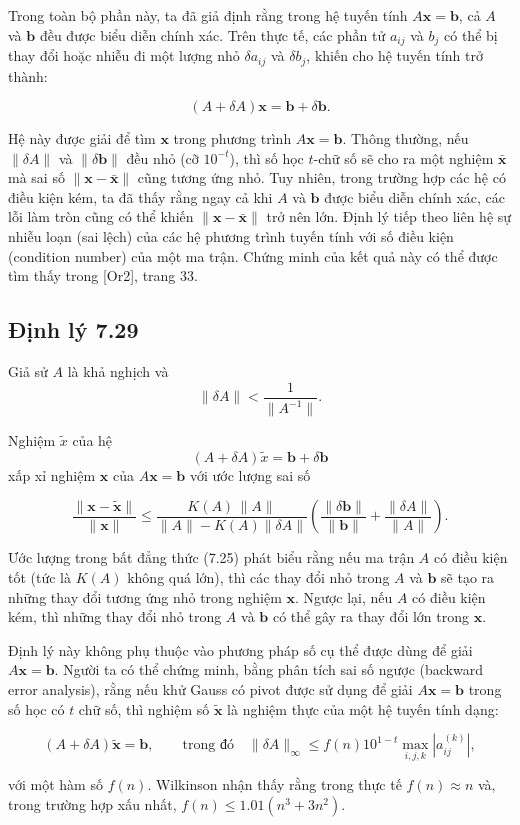 Trong toàn bộ phần này, ta đã giả định rằng trong hệ tuyến tính $A\mathbf{x} = \mathbf{b}$, cả $A$ và $\mathbf{b}$ đều được biểu diễn chính xác.  
Trên thực tế, các phần tử $a_{ij}$ và $b_j$ có thể bị thay đổi hoặc nhiễu đi một lượng nhỏ $\delta a_{ij}$ và $\delta b_j$, khiến cho hệ tuyến tính trở thành:

\[
(A + \delta A)\mathbf{x} = \mathbf{b} + \delta \mathbf{b}.
\]

Hệ này được giải để tìm $\mathbf{x}$ trong phương trình $A\mathbf{x} = \mathbf{b}$.  
Thông thường, nếu $\|\delta A\|$ và $\|\delta \mathbf{b}\|$ đều nhỏ (cỡ $10^{-t}$), thì số học $t$-chữ số sẽ cho ra một nghiệm $\bar{\mathbf{x}}$ mà sai số $\|\mathbf{x} - \bar{\mathbf{x}}\|$ cũng tương ứng nhỏ.  
Tuy nhiên, trong trường hợp các hệ có điều kiện kém, ta đã thấy rằng ngay cả khi $A$ và $\mathbf{b}$ được biểu diễn chính xác, các lỗi làm tròn cũng có thể khiến $\|\mathbf{x} - \bar{\mathbf{x}}\|$ trở nên lớn. Định lý tiếp theo liên hệ sự nhiễu loạn (sai lệch) của các hệ phương trình tuyến tính với số điều kiện (condition number) của một ma trận. Chứng minh của kết quả này có thể được tìm thấy trong [Or2], trang 33.


\subsection*{Định lý 7.29}

Giả sử \(A\) là khả nghịch và
\[
\|\delta A\| < \frac{1}{\|A^{-1}\|}.
\]

Nghiệm \(\tilde{x}\) của hệ
\[
(A + \delta A)\tilde{x} = \mathbf{b} + \delta\mathbf{b}
\]
xấp xỉ nghiệm \(\mathbf{x}\) của \(A\mathbf{x} = \mathbf{b}\) với ước lượng sai số

\[
\frac{\|\mathbf{x} - \tilde{\mathbf{x}}\|}{\|\mathbf{x}\|}
\le
\frac{K(A)\,\|A\|}{\|A\| - K(A)\|\delta A\|}
\left(
\frac{\|\delta\mathbf{b}\|}{\|\mathbf{b}\|}
+
\frac{\|\delta A\|}{\|A\|}
\right).
\tag{7.25}
\]

Ước lượng trong bất đẳng thức (7.25) phát biểu rằng nếu ma trận \(A\) có điều kiện tốt (tức là \(K(A)\) không quá lớn), thì các thay đổi nhỏ trong \(A\) và \(\mathbf{b}\) sẽ tạo ra những thay đổi tương ứng nhỏ trong nghiệm \(\mathbf{x}\). Ngược lại, nếu \(A\) có điều kiện kém, thì những thay đổi nhỏ trong \(A\) và \(\mathbf{b}\) có thể gây ra thay đổi lớn trong \(\mathbf{x}\).

Định lý này không phụ thuộc vào phương pháp số cụ thể được dùng để giải \(A\mathbf{x} = \mathbf{b}\).  
Người ta có thể chứng minh, bằng phân tích sai số ngược (backward error analysis), rằng nếu khử Gauss có pivot được sử dụng để giải \(A\mathbf{x} = \mathbf{b}\) trong số học có \(t\) chữ số, thì nghiệm số \(\tilde{\mathbf{x}}\) là nghiệm thực của một hệ tuyến tính dạng:

\[
(A + \delta A)\tilde{\mathbf{x}} = \mathbf{b},
\qquad\text{trong đó}\quad
\|\delta A\|_\infty \le f(n)10^{1-t}\max_{i,j,k}|a_{ij}^{(k)}|,
\]

với một hàm số \(f(n)\). Wilkinson nhận thấy rằng trong thực tế \(f(n)\approx n\) và, trong trường hợp xấu nhất, \(f(n) \le 1.01(n^3 + 3n^2)\).


